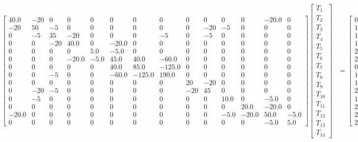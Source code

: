 \documentclass[10pt]{article}
\begin{document}
\begin{landscape}
{\begin{align*}
\left[\begin{array}{cccccccccccccc}40.0 & -20 & 0 & 0 & 0 & 0 & 0 & 0 & 0 & 0 & 0 & 0 & -20.0 & 0\\-20 & 50 & -5 & 0 & 0 & 0 & 0 & 0 & 0 & -20 & -5 & 0 & 0 & 0\\0 & -5 & 35 & -20 & 0 & 0 & 0 & -5 & 0 & -5 & 0 & 0 & 0 & 0\\0 & 0 & -20 & 40.0 & 0 & -20.0 & 0 & 0 & 0 & 0 & 0 & 0 & 0 & 0\\0 & 0 & 0 & 0 & 5.0 & -5.0 & 0 & 0 & 0 & 0 & 0 & 0 & 0 & 0\\0 & 0 & 0 & -20.0 & -5.0 & 45.0 & 40.0 & -60.0 & 0 & 0 & 0 & 0 & 0 & 0\\0 & 0 & 0 & 0 & 0 & 40.0 & 85.0 & -125.0 & 0 & 0 & 0 & 0 & 0 & 0\\0 & 0 & -5 & 0 & 0 & -60.0 & -125.0 & 190.0 & 0 & 0 & 0 & 0 & 0 & 0\\0 & 0 & 0 & 0 & 0 & 0 & 0 & 0 & 20 & -20 & 0 & 0 & 0 & 0\\0 & -20 & -5 & 0 & 0 & 0 & 0 & 0 & -20 & 45 & 0 & 0 & 0 & 0\\0 & -5 & 0 & 0 & 0 & 0 & 0 & 0 & 0 & 0 & 10.0 & 0 & -5.0 & 0\\0 & 0 & 0 & 0 & 0 & 0 & 0 & 0 & 0 & 0 & 0 & 20.0 & -20.0 & 0\\-20.0 & 0 & 0 & 0 & 0 & 0 & 0 & 0 & 0 & 0 & -5.0 & -20.0 & 50.0 & -5.0\\0 & 0 & 0 & 0 & 0 & 0 & 0 & 0 & 0 & 0 & 0 & 0 & -5.0 & 5.0\end{array}\right]  \left[\begin{matrix}T_{1}\\T_{2}\\T_{3}\\T_{4}\\T_{5}\\T_{6}\\T_{7}\\T_{8}\\T_{9}\\T_{10}\\T_{11}\\T_{12}\\T_{13}\\T_{14}\end{matrix}\right] &= \left[\begin{matrix}0\\100.0\\100.0\\100.0\\225.0\\250.0\\0\\125.0\\100.0\\200.0\\100.0\\225.0\\250.0\\25.0\end{matrix}\right]
\end{align*}
}


\end{landscape}
\end{document}

